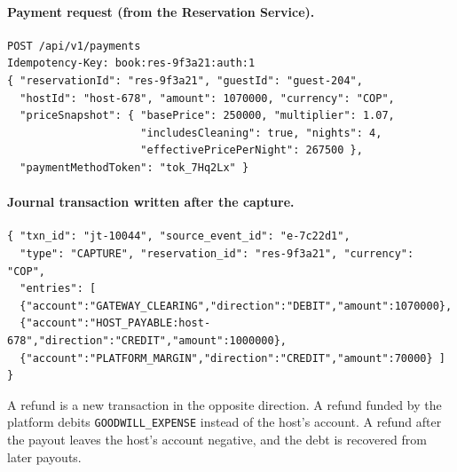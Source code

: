 \paragraph{Payment request (from the Reservation Service).}
{\footnotesize
\begin{verbatim}
POST /api/v1/payments
Idempotency-Key: book:res-9f3a21:auth:1
{ "reservationId": "res-9f3a21", "guestId": "guest-204",
  "hostId": "host-678", "amount": 1070000, "currency": "COP",
  "priceSnapshot": { "basePrice": 250000, "multiplier": 1.07,
                     "includesCleaning": true, "nights": 4,
                     "effectivePricePerNight": 267500 },
  "paymentMethodToken": "tok_7Hq2Lx" }
\end{verbatim}
}

\paragraph{Journal transaction written after the capture.}
{\footnotesize
\begin{verbatim}
{ "txn_id": "jt-10044", "source_event_id": "e-7c22d1",
  "type": "CAPTURE", "reservation_id": "res-9f3a21", "currency": "COP",
  "entries": [
  {"account":"GATEWAY_CLEARING","direction":"DEBIT","amount":1070000},
  {"account":"HOST_PAYABLE:host-678","direction":"CREDIT","amount":1000000},
  {"account":"PLATFORM_MARGIN","direction":"CREDIT","amount":70000} ] }
\end{verbatim}
}

A refund is a new transaction in the opposite direction. A refund funded by
the platform debits \texttt{GOODWILL\_\allowbreak EXPENSE} instead of the host's account.
A refund after the payout leaves the host's account negative, and the debt is
recovered from later payouts.
\endgroup

